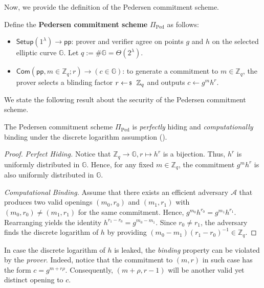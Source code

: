 \documentclass[../../book]{subfiles}
\begin{document}
Now, we provide the definition of the Pedersen commitment scheme.

\begin{definition}
    Define the \textbf{Pedersen commitment scheme} $\Pi_{\text{Ped}}$ as follows:
    \begin{itemize}
        \item $\mathsf{Setup}(1^{\lambda}) \to \mathsf{pp}$: prover and verifier agree on points $g$ and $h$ on the selected elliptic curve $\mathbb{G}$.
        Let $q:=\#\mathbb{G}=\Theta(2^{\lambda})$.
        \item $\mathsf{Com}(\mathsf{pp}, m \in \mathbb{Z}_q; r) \to (c \in \mathbb{G})$: to generate a commitment to $m \in \mathbb{Z}_q$, the prover selects a blinding factor $r \leftarrowS \mathbb{Z}_q$ and outputs $c \gets g^m h^r$.
    \end{itemize}
\end{definition}

We state the following result about the security of the Pedersen commitment scheme.

\begin{lemma}\label{lemma:pedersen-hiding-binding}
    The Pedersen commitment scheme $\Pi_{\text{Ped}}$ is \emph{perfectly} hiding and \emph{computationally} binding under the discrete logarithm assumption ().
\end{lemma}

\begin{proof}
    \emph{Perfect Hiding.} Notice that $\mathbb{Z}_q \to \mathbb{G}, r \mapsto h^r$ is a bijection. Thus, $h^r$ is uniformly distributed in $\mathbb{G}$.
    Hence, for any fixed $m \in \mathbb{Z}_q$, the commitment $g^mh^r$ is also uniformly distributed in $\mathbb{G}$.

    \emph{Computational Binding.} Assume that there exists an efficient adversary $\mathcal{A}$ that produces two valid openings $(m_0,r_0)$ and $(m_1,r_1)$ with $(m_0,r_0) \neq (m_1,r_1)$ for the same commitment. 
    Hence, $g^{m_0}h^{r_0} = g^{m_1}h^{r_1}$.
    Rearranging yields the identity $h^{r_1-r_0} = g^{m_0-m_1}$. 
    Since $r_0 \neq r_1$, the adversary finds the discrete logarithm of $h$ by providing $(m_0-m_1)(r_1-r_0)^{-1} \in \mathbb{Z}_q$.
\end{proof}

\begin{remark}
    In case the discrete logarithm of $h$ is leaked, the \emph{binding} property can be violated by the \emph{prover}.
    Indeed, notice that the commitment to $(m,r)$ in such case has the form $c = g^{m + r\rho}$.
    Consequently, $(m+\rho, r-1)$ will be another valid yet distinct opening to $c$.
\end{remark}
\end{document}
